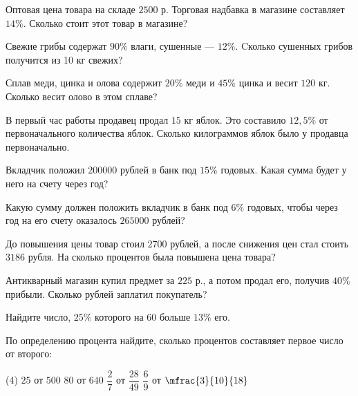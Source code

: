 \begin{class}[number=4]
	\begin{listofex}
		\item Оптовая цена товара на складе \( 2500 \) р. Торговая надбавка в магазине составляет \( 14\% \). Сколько стоит этот товар в магазине?
		\item Свежие грибы содержат \( 90\% \) влаги, сушенные --- \( 12\% \). Cколько сушенных грибов получится из 10 кг свежих?
		\item Сплав меди, цинка и олова содержит \(20\% \) меди и \(45\% \) цинка и весит \(120\) кг. Сколько весит олово в этом сплаве?
		\item В первый час работы продавец продал \( 15 \) кг яблок. Это составило \( 12,5\% \) от первоначального количества яблок. Сколько килограммов яблок было у продавца первоначально.
		\item Вкладчик положил \( 200 000 \) рублей в банк под \( 15\% \) годовых. Какая сумма будет у него на счету через год?
		\item Какую сумму должен положить вкладчик в банк под \( 6\% \) годовых, чтобы через год на его счету оказалось \( 265 000 \) рублей?
		\item До повышения цены товар стоил \( 2700 \) рублей, а после снижения цен стал стоить \( 3186 \) рубля. На сколько процентов была повышена цена товара?
		\item Антикварный магазин купил предмет за \(225\) р., а потом продал его, получив \(40 \%\) прибыли. Сколько рублей заплатил покупатель?
		\item Найдите число, \( 25\% \) которого на \( 60 \) больше \( 13\% \) его.
		\item По определению процента найдите, сколько процентов составляет первое число от второго:
		\begin{tasks}(4)
			\task \( 25 \) от \( 500 \)
			\task \( 80 \) от \( 640 \)
			\task \( \dfrac{2}{7} \) от \( \dfrac{28}{49} \)
			\task \( \dfrac{6}{9} \) от \( \mfrac{3}{10}{18} \)
		\end{tasks}
	\end{listofex}
\end{class}
%
%

